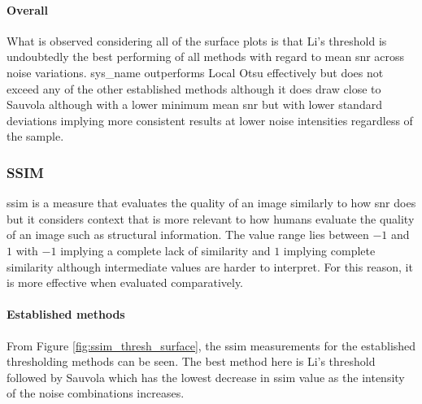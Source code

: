 \paragraph{Overall}
What is observed considering all of the surface plots is that Li's threshold is undoubtedly the best performing of all methods with regard to mean \gls{snr} across noise variations. \gls{sys_name} outperforms Local Otsu effectively but does not exceed any of the other established methods although it does draw close to Sauvola although with a lower minimum mean \gls{snr} but with lower standard deviations implying more consistent results at lower noise intensities regardless of the sample.

\subsubsection{SSIM}
\gls{ssim} is a measure that evaluates the quality of an image similarly to how \gls{snr} does but it considers context that is more relevant to how humans evaluate the quality of an image such as structural information. The value range lies between $-1$ and $1$ with $-1$ implying a complete lack of similarity and $1$ implying complete similarity although intermediate values are harder to interpret. For this reason, it is more effective when evaluated comparatively.

\paragraph{Established methods}
From Figure \ref{fig:ssim_thresh_surface}, the \gls{ssim} measurements for the established thresholding methods can be seen. The best method here is Li's threshold followed by Sauvola which has the lowest decrease in \gls{ssim} value as the intensity of the noise combinations increases.


